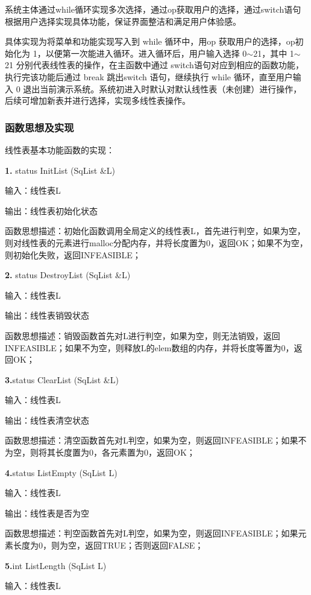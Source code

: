 \documentclass[supercite]{Experimental_Report}
\theoremstyle{definition}
\begin{document}
系统主体通过while循环实现多次选择，通过op获取用户的选择，通过switch语句根据用户选择实现具体功能，保证界面整洁和满足用户体验感。

具体实现为将菜单和功能实现写入到 while 循环中，用op 获取用户的选择，op初始化为 1，以便第一次能进入循环。进入循环后，用户输入选择 0$\sim$21，其中 1$\sim$21 分别代表线性表的操作，在主函数中通过 switch语句对应到相应的函数功能，执行完该功能后通过 break 跳出switch 语句，继续执行 while 循环，直至用户输入 0 退出当前演示系统。系统初进入时默认对默认线性表（未创建）进行操作，后续可增加新表并进行选择，实现多线性表操作。

\subsubsection{函数思想及实现}

线性表基本功能函数的实现：

\noindent\textbf{ 1. }status InitList (SqList \&L)

输入：线性表L

输出：线性表初始化状态

函数思想描述：初始化函数调用全局定义的线性表L，首先进行判空，如果为空，则对线性表的元素进行malloc分配内存，并将长度置为0，返回OK；如果不为空，则初始化失败，返回INFEASIBLE；

\noindent\textbf{ 2.} status DestroyList (SqList \&L)

输入：线性表L

输出：线性表销毁状态

函数思想描述：销毁函数首先对L进行判空，如果为空，则无法销毁，返回INFEASIBLE；如果不为空，则释放L的elem数组的内存，并将长度等置为0，返回OK；

\noindent\textbf{ 3.}status ClearList (SqList \&L)

输入：线性表L

输出：线性表清空状态

函数思想描述：清空函数首先对L判空，如果为空，则返回INFEASIBLE；如果不为空，则将其长度置为0，各元素置为0，返回OK；

\noindent\textbf{ 4.}status ListEmpty (SqList L)

输入：线性表L

输出：线性表是否为空

函数思想描述：判空函数首先对L判空，如果为空，则返回INFEASIBLE；如果元素长度为0，则为空，返回TRUE；否则返回FALSE；

\noindent\textbf{ 5.}int ListLength (SqList L)

输入：线性表L
\end{document}
